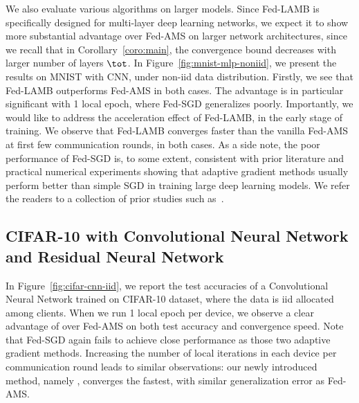 \documentclass{article}
\begin{document}
We also evaluate various algorithms on larger models. 
Since Fed-LAMB is specifically designed for multi-layer deep learning networks, we expect it to show more substantial advantage over Fed-AMS on larger network architectures, since we recall that in Corollary~\ref{coro:main}, the convergence bound decreases with larger number of layers $\tot$.
In Figure~\ref{fig:mnist-mlp-noniid}, we present the results on MNIST with CNN, under non-iid data distribution. Firstly, we see that Fed-LAMB outperforms Fed-AMS in both cases. The advantage is in particular significant with 1 local epoch, where Fed-SGD generalizes poorly. Importantly, we would like to address the acceleration effect of Fed-LAMB, in the early stage of training. We observe that Fed-LAMB converges faster than the vanilla Fed-AMS at first few communication rounds, in both cases. 
As a side note, the poor performance of Fed-SGD is, to some extent, consistent with prior literature and practical numerical experiments showing that adaptive gradient methods usually perform better than simple SGD in training large deep learning models. We refer the readers to a collection of prior studies such as~\citet{chen2020toward,reddi2020adaptive}. 

%


\subsection{CIFAR-10 with Convolutional Neural Network and Residual Neural Network}

In Figure~\ref{fig:cifar-cnn-iid}, we report the test accuracies of a Convolutional Neural Network trained on CIFAR-10 dataset, where the data is iid allocated among clients. 
When we run 1 local epoch per device, we observe a clear advantage of \algo over Fed-AMS on both test accuracy and convergence speed.
Note that Fed-SGD again fails to achieve close performance as those two adaptive gradient methods. 
Increasing the number of local iterations in each device per communication round leads to similar observations: our newly introduced method, namely \algo, converges the fastest, with similar generalization error as Fed-AMS. 
\end{document}
